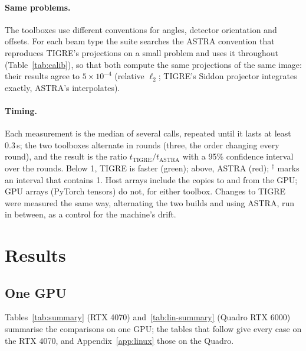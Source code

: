 \documentclass[11pt,a4paper]{article}
\newcommand{\tfast}[1]{\textcolor{fastc}{#1}}
\newcommand{\tslow}[1]{\textcolor{slowc}{#1}}
\begin{document}
\paragraph{Same problems.}
The toolboxes use different conventions for angles, detector orientation and offsets. For each beam type the
suite searches the ASTRA convention that reproduces TIGRE's projections on a small problem and uses it
throughout (Table~\ref{tab:calib}), so that both compute the same projections of the same image: their results
agree to $5\times10^{-4}$ (relative $\ell_2$; TIGRE's Siddon projector integrates exactly, ASTRA's interpolates).

\paragraph{Timing.}
Each measurement is the median of several calls, repeated until it lasts at least 0.3\,s; the two toolboxes
alternate in rounds (three, the order changing every round), and the result is the ratio
$t_\text{TIGRE}/t_\text{ASTRA}$ with a 95\% confidence interval over the rounds. Below 1, TIGRE is faster
(\tfast{green}); above, ASTRA (\tslow{red}); $^\dagger$ marks an interval that contains 1. Host arrays include
the copies to and from the GPU; GPU arrays (PyTorch tensors) do not, for either toolbox. Changes to TIGRE were
measured the same way, alternating the two builds and using ASTRA, run in between, as a control for the
machine's drift.


\section{Results}\label{sec:results}
\subsection{One GPU}
Tables~\ref{tab:summary} (RTX 4070) and~\ref{tab:lin-summary} (Quadro RTX 6000) summarise the comparisons on one
GPU; the tables that follow give every case on the RTX 4070, and Appendix~\ref{app:linux} those on the Quadro.
\end{document}
